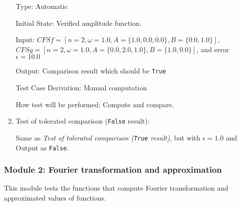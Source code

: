 \documentclass[12pt, titlepage]{article}
\newcommand{\li}[1]{\texttt{#1}}
\begin{document}
\begin{enumerate}
	Type: Automatic
	
	Initial State: Verified amplitude function.
	
	Input: $\mathit{CFSf}=[n=2, \omega=1.0, A=\{1.0, 0.0, 0.0\}, B=\{0.0, 1.0\}]$, 
	$\mathit{CFSg}=[n=2, \omega=1.0, A=\{0.0, 2.0, 1.0\}, B=\{1.0, 0.0\}]$, and error $\epsilon=10.0$
	
	Output: Comparison result which should be \li{True}
	
	Test Case Derivation: Manual computation
	
	How test will be performed: Compute and compare.
	
	\item{Test of tolerated comparison  (\li{False} result):\\}
	
	Same as \textit{Test of tolerated comparison  (\li{True} result)}, but with $\epsilon=1.0$ and Output as \li{False}.    
\end{enumerate}

\subsubsection{Module 2: Fourier transformation and approximation}
This module tests the functions that compute Fourier transformation and approximated values of functions.
\end{document}
